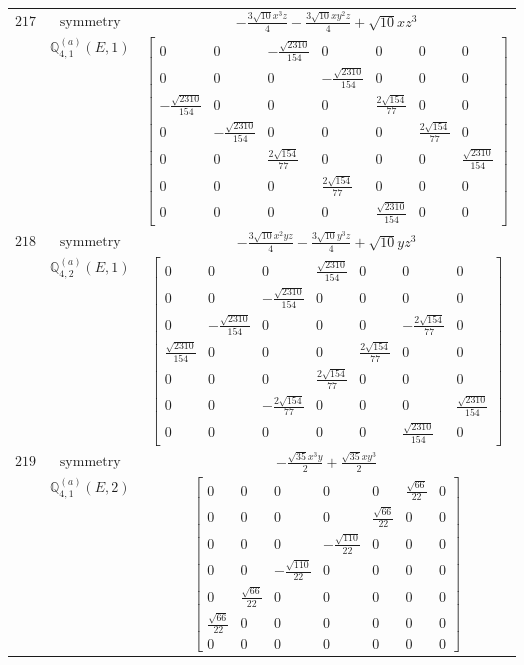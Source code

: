\documentclass[fleqn,8pt,landscape]{jsarticle}
\begin{document}
\begin{longtable}{ccc}
$ 217 $ & $ \text{symmetry} $ & $ - \frac{3 \sqrt{10} x^{3} z}{4} - \frac{3 \sqrt{10} x y^{2} z}{4} + \sqrt{10} x z^{3} $ \\
$  $ & $ \mathbb{Q}_{4,1}^{(a)}(E,1) $ & $ \begin{bmatrix} 0 & 0 & - \frac{\sqrt{2310}}{154} & 0 & 0 & 0 & 0 \\ 0 & 0 & 0 & - \frac{\sqrt{2310}}{154} & 0 & 0 & 0 \\ - \frac{\sqrt{2310}}{154} & 0 & 0 & 0 & \frac{2 \sqrt{154}}{77} & 0 & 0 \\ 0 & - \frac{\sqrt{2310}}{154} & 0 & 0 & 0 & \frac{2 \sqrt{154}}{77} & 0 \\ 0 & 0 & \frac{2 \sqrt{154}}{77} & 0 & 0 & 0 & \frac{\sqrt{2310}}{154} \\ 0 & 0 & 0 & \frac{2 \sqrt{154}}{77} & 0 & 0 & 0 \\ 0 & 0 & 0 & 0 & \frac{\sqrt{2310}}{154} & 0 & 0 \end{bmatrix} $ \\ \hline
$ 218 $ & $ \text{symmetry} $ & $ - \frac{3 \sqrt{10} x^{2} y z}{4} - \frac{3 \sqrt{10} y^{3} z}{4} + \sqrt{10} y z^{3} $ \\
$  $ & $ \mathbb{Q}_{4,2}^{(a)}(E,1) $ & $ \begin{bmatrix} 0 & 0 & 0 & \frac{\sqrt{2310}}{154} & 0 & 0 & 0 \\ 0 & 0 & - \frac{\sqrt{2310}}{154} & 0 & 0 & 0 & 0 \\ 0 & - \frac{\sqrt{2310}}{154} & 0 & 0 & 0 & - \frac{2 \sqrt{154}}{77} & 0 \\ \frac{\sqrt{2310}}{154} & 0 & 0 & 0 & \frac{2 \sqrt{154}}{77} & 0 & 0 \\ 0 & 0 & 0 & \frac{2 \sqrt{154}}{77} & 0 & 0 & 0 \\ 0 & 0 & - \frac{2 \sqrt{154}}{77} & 0 & 0 & 0 & \frac{\sqrt{2310}}{154} \\ 0 & 0 & 0 & 0 & 0 & \frac{\sqrt{2310}}{154} & 0 \end{bmatrix} $ \\ \hline
$ 219 $ & $ \text{symmetry} $ & $ - \frac{\sqrt{35} x^{3} y}{2} + \frac{\sqrt{35} x y^{3}}{2} $ \\
$  $ & $ \mathbb{Q}_{4,1}^{(a)}(E,2) $ & $ \begin{bmatrix} 0 & 0 & 0 & 0 & 0 & \frac{\sqrt{66}}{22} & 0 \\ 0 & 0 & 0 & 0 & \frac{\sqrt{66}}{22} & 0 & 0 \\ 0 & 0 & 0 & - \frac{\sqrt{110}}{22} & 0 & 0 & 0 \\ 0 & 0 & - \frac{\sqrt{110}}{22} & 0 & 0 & 0 & 0 \\ 0 & \frac{\sqrt{66}}{22} & 0 & 0 & 0 & 0 & 0 \\ \frac{\sqrt{66}}{22} & 0 & 0 & 0 & 0 & 0 & 0 \\ 0 & 0 & 0 & 0 & 0 & 0 & 0 \end{bmatrix} $ \\ \hline

\end{longtable}
\end{document}
